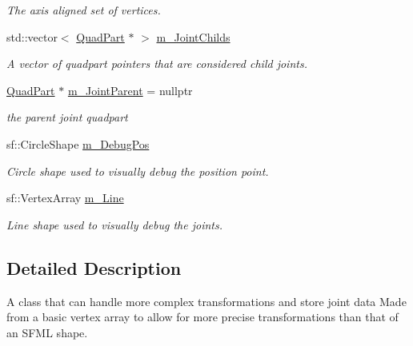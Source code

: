 \begin{DoxyCompactItemize}
\begin{DoxyCompactList}\small\item\em The axis aligned set of vertices. \end{DoxyCompactList}\item 
\mbox{\label{class_quad_part_a8e70593060fcfcceff9ee0b1114a32ec}} 
std\+::vector$<$ \hyperlink{class_quad_part}{Quad\+Part} $\ast$ $>$ \hyperlink{class_quad_part_a8e70593060fcfcceff9ee0b1114a32ec}{m\+\_\+\+Joint\+Childs}
\begin{DoxyCompactList}\small\item\em A vector of quadpart pointers that are considered child joints. \end{DoxyCompactList}\item 
\mbox{\label{class_quad_part_ab9aaf10324b5fb53b97bb78d5dce50f6}} 
\hyperlink{class_quad_part}{Quad\+Part} $\ast$ \hyperlink{class_quad_part_ab9aaf10324b5fb53b97bb78d5dce50f6}{m\+\_\+\+Joint\+Parent} = nullptr
\begin{DoxyCompactList}\small\item\em the parent joint quadpart \end{DoxyCompactList}\item 
\mbox{\label{class_quad_part_a6efe36f01066bd02043fd5c347bde469}} 
sf\+::\+Circle\+Shape \hyperlink{class_quad_part_a6efe36f01066bd02043fd5c347bde469}{m\+\_\+\+Debug\+Pos}
\begin{DoxyCompactList}\small\item\em Circle shape used to visually debug the position point. \end{DoxyCompactList}\item 
\mbox{\label{class_quad_part_a88f47663d08376676056b0e1cb76ae5f}} 
sf\+::\+Vertex\+Array \hyperlink{class_quad_part_a88f47663d08376676056b0e1cb76ae5f}{m\+\_\+\+Line}
\begin{DoxyCompactList}\small\item\em Line shape used to visually debug the joints. \end{DoxyCompactList}\end{DoxyCompactItemize}


\subsection{Detailed Description}
A class that can handle more complex transformations and store joint data Made from a basic vertex array to allow for more precise transformations than that of an S\+F\+ML shape. 

